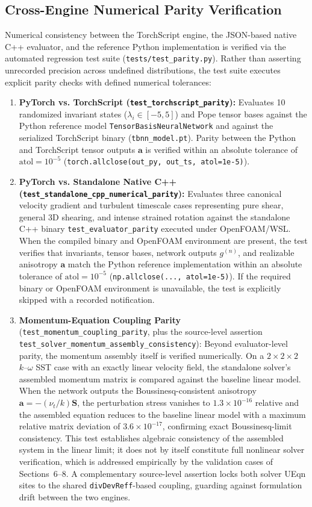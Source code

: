 \documentclass[11pt,a4paper]{article}
\begin{document}
\subsection{Cross-Engine Numerical Parity Verification}
Numerical consistency between the TorchScript engine, the JSON-based native C++ evaluator, and the reference Python implementation is verified via the automated regression test suite (\texttt{tests/test\_parity.py}). Rather than asserting unrecorded precision across undefined distributions, the test suite executes explicit parity checks with defined numerical tolerances:
\begin{enumerate}
    \item \textbf{PyTorch vs. TorchScript (\texttt{test\_torchscript\_parity}):} Evaluates 10 randomized invariant states ($\lambda_i \in [-5, 5]$) and Pope tensor bases against the Python reference model \texttt{TensorBasisNeuralNetwork} and against the serialized TorchScript binary (\texttt{tbnn\_model.pt}). Parity between the Python and TorchScript tensor outputs $\mathbf{a}$ is verified within an absolute tolerance of $\mathrm{atol} = 10^{-5}$ (\texttt{torch.allclose(out\_py, out\_ts, atol=1e-5)}).
    \item \textbf{PyTorch vs. Standalone Native C++ (\texttt{test\_standalone\_cpp\_numerical\_parity}):} Evaluates three canonical velocity gradient and turbulent timescale cases representing pure shear, general 3D shearing, and intense strained rotation against the standalone C++ binary \texttt{test\_evaluator\_parity} executed under OpenFOAM/WSL. When the compiled binary and OpenFOAM environment are present, the test verifies that invariants, tensor bases, network outputs $g^{(n)}$, and realizable anisotropy $\mathbf{a}$ match the Python reference implementation within an absolute tolerance of $\mathrm{atol} = 10^{-5}$ (\texttt{np.allclose(..., atol=1e-5)}). If the required binary or OpenFOAM environment is unavailable, the test is explicitly skipped with a recorded notification.
    \item \textbf{Momentum-Equation Coupling Parity} (\texttt{test\_momentum\_coupling\_parity}, plus the source-level assertion \texttt{test\_solver\_momentum\_assembly\_consistency}): Beyond evaluator-level parity, the momentum assembly itself is verified numerically. On a $2 \times 2 \times 2$ $k\text{--}\omega$ SST case with an exactly linear velocity field, the standalone solver's assembled momentum matrix is compared against the baseline linear model. When the network outputs the Boussinesq-consistent anisotropy $\mathbf{a} = -(\nu_t/k)\mathbf{S}$, the perturbation stress vanishes to $1.3 \times 10^{-16}$ relative and the assembled equation reduces to the baseline linear model with a maximum relative matrix deviation of $3.6 \times 10^{-17}$, confirming exact Boussinesq-limit consistency. This test establishes algebraic consistency of the assembled system in the linear limit; it does not by itself constitute full nonlinear solver verification, which is addressed empirically by the validation cases of Sections~6--8. A complementary source-level assertion locks both solver UEqn sites to the shared \texttt{divDevReff}-based coupling, guarding against formulation drift between the two engines.
\end{enumerate}
\end{document}
